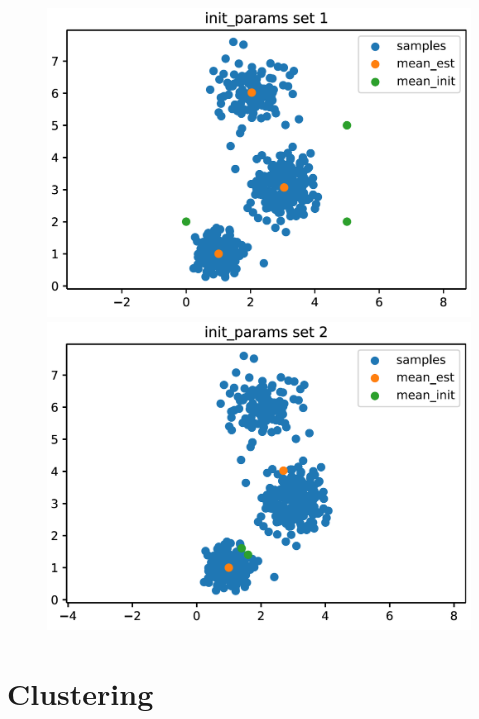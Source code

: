 \documentclass[DIV=12, ngerman, fontsize=12pt, parskip=half]{scrreprt}
\begin{document}
	\begin{figure}[H]
		\begin{minipage}[b]{0.5\textwidth}
			\includegraphics[width=\textwidth]{Task2_initparams_set1_png}
		\end{minipage}
		\begin{minipage}[b]{0.5\textwidth}
			\includegraphics[width=\textwidth]{Task2_initparams_set2_png}
		\end{minipage}
	\end{figure}

	\vspace{3cm}
	

	{\let\clearpage\relax \chapter{Clustering}}
	
\end{document}
